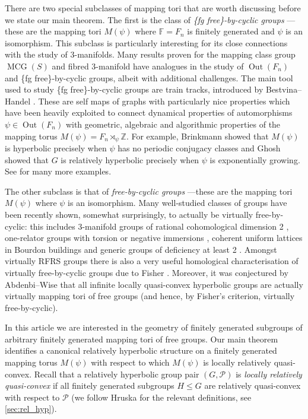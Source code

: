 \documentclass[11pt, a4paper]{amsart}
\theoremstyle{definition}
\newcommand{\F}{\mathbb{F}}
\newcommand{\Z}{\mathbb{Z}}
\DeclareMathOperator{\Out}{Out}
\DeclareMathOperator{\MCG}{MCG}
\begin{document}
There are two special subclasses of mapping tori that are worth discussing before we state our main theorem. The first is the class of \emph{\{fg free\}-by-cyclic groups} ---these are the mapping tori $M(\psi)$ where $\F = F_n$ is finitely generated and $\psi$ is an isomorphism. This subclass is particularly interesting for its close connections with the study of 3-manifolds. Many results proven for the mapping class group $\MCG(S)$ and fibred 3-manifold have analogues in the study of $\Out(F_n)$ and \{fg free\}-by-cyclic groups, albeit with additional challenges. The main tool used to study \{fg free\}-by-cyclic groups are train tracks, introduced by Bestvina--Handel \cite{BH92}. These are self maps of graphs with particularly nice properties which have been heavily exploited to connect dynamical properties of automorphisms $\psi\in\Out(F_n)$ with geometric, algebraic and algorithmic properties of the mapping torus $M(\psi) = F_n\rtimes_{\psi}\Z$. For example, Brinkmann \cite{Br00} showed that $M(\psi)$ is hyperbolic precisely when $\psi$ has no periodic conjugacy classes and Ghosh \cite{Gh23} showed that $G$ is relatively hyperbolic precisely when $\psi$ is exponentially growing. See \cite{BFH00,BFH05,BMMV06,BG10,HW15} for many more examples.

The other subclass is that of \emph{free-by-cyclic groups} ---these are the mapping tori $M(\psi)$ where $\psi$ is an isomorphism. Many well-studied classes of groups have been recently shown, somewhat surprisingly, to actually be virtually free-by-cyclic: this includes 3-manifold groups of rational cohomological dimension 2 \cite{KL24a}, one-relator groups with torsion or negative immersions \cite{KL24b}, coherent uniform lattices in Bourdon buildings \cite{KL24b} and generic groups of deficiency at least 2 \cite{KKW22}. Amongst virtually RFRS groups there is also a very useful homological characterisation of virtually free-by-cyclic groups due to Fisher \cite{Fi25}. Moreover, it was conjectured by Abdenbi--Wise \cite[Conjecture 1.6]{AW23} that all infinite locally quasi-convex hyperbolic groups are actually virtually mapping tori of free groups (and hence, by Fisher's criterion, virtually free-by-cyclic).

In this article we are interested in the geometry of finitely generated subgroups of arbitrary finitely generated mapping tori of free groups. Our main theorem identifies a canonical relatively hyperbolic structure on a finitely generated mapping torus $M(\psi)$ with respect to which $M(\psi)$ is locally relatively quasi-convex. Recall that a relatively hyperbolic group pair $(G, \mathcal{P})$ is \emph{locally relatively quasi-convex} if all finitely generated subgroups $H\leqslant G$ are relatively quasi-convex with respect to $\mathcal{P}$ (we follow Hruska \cite{Hr10} for the relevant definitions, see \cref{sec:rel_hyp}).
\end{document}
